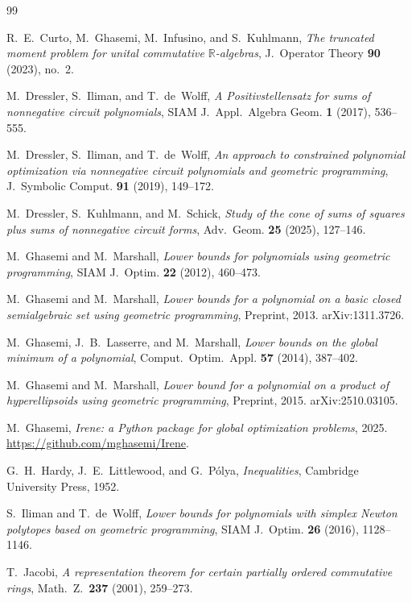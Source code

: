 \documentclass{amsart}
\theoremstyle{definition}
\numberwithin{equation}{section}
\newcommand{\reals}{\mathbb{R}}
\begin{document}
\begin{thebibliography}{99}

R.~E.~Curto, M.~Ghasemi, M.~Infusino, and S.~Kuhlmann,
\emph{The truncated moment problem for unital commutative $\reals$-algebras},
J.~Operator Theory \textbf{90} (2023), no.~2.

M.~Dressler, S.~Iliman, and T.~de~Wolff,
\emph{A Positivstellensatz for sums of nonnegative circuit polynomials},
SIAM J.~Appl.~Algebra Geom. \textbf{1} (2017), 536--555.

M.~Dressler, S.~Iliman, and T.~de~Wolff,
\emph{An approach to constrained polynomial optimization via nonnegative
circuit polynomials and geometric programming},
J.~Symbolic Comput. \textbf{91} (2019), 149--172.

M.~Dressler, S.~Kuhlmann, and M.~Schick,
\emph{Study of the cone of sums of squares plus sums of nonnegative circuit
forms},
Adv.~Geom. \textbf{25} (2025), 127--146.

M.~Ghasemi and M.~Marshall,
\emph{Lower bounds for polynomials using geometric programming},
SIAM J.~Optim. \textbf{22} (2012), 460--473.

M.~Ghasemi and M.~Marshall,
\emph{Lower bounds for a polynomial on a basic closed semialgebraic set using
geometric programming},
Preprint, 2013.  arXiv:1311.3726.

M.~Ghasemi, J.~B.~Lasserre, and M.~Marshall,
\emph{Lower bounds on the global minimum of a polynomial},
Comput.~Optim.~Appl. \textbf{57} (2014), 387--402.

M.~Ghasemi and M.~Marshall,
\emph{Lower bound for a polynomial on a product of hyperellipsoids using
geometric programming},
Preprint, 2015.  arXiv:2510.03105.

M.~Ghasemi,
\emph{Irene: a Python package for global optimization problems},
2025.  \url{https://github.com/mghasemi/Irene}.

G.~H.~Hardy, J.~E.~Littlewood, and G.~P\'olya,
\emph{Inequalities},
Cambridge University Press, 1952.

S.~Iliman and T.~de~Wolff,
\emph{Lower bounds for polynomials with simplex Newton polytopes based on
geometric programming},
SIAM J.~Optim. \textbf{26} (2016), 1128--1146.

T.~Jacobi,
\emph{A representation theorem for certain partially ordered commutative rings},
Math.~Z.~\textbf{237} (2001), 259--273.


\end{thebibliography}
\end{document}
